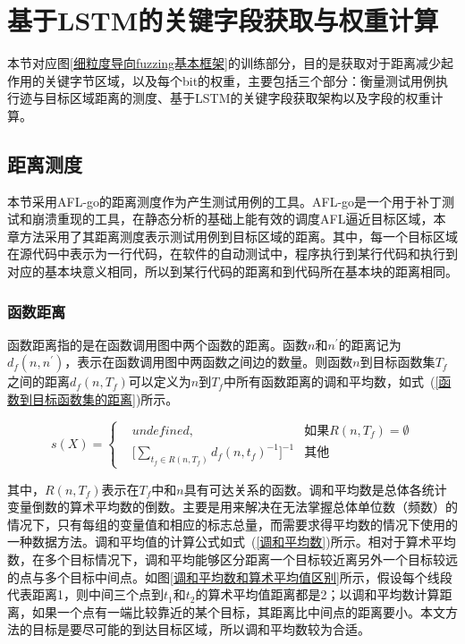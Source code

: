 \section{基于LSTM的关键字段获取与权重计算}
\label{基于LSTM的关键字段获取}

本节对应图\ref{细粒度导向fuzzing基本框架}的训练部分，目的是获取对于距离减少起作用的关键字节区域，以及每个bit的权重，主要包括三个部分：衡量测试用例执行迹与目标区域距离的测度、基于LSTM的关键字段获取架构以及字段的权重计算。

\subsection{距离测度}
\label{距离测度}

本节采用AFL-go的距离测度作为产生测试用例的工具。AFL-go是一个用于补丁测试和崩溃重现的工具，在静态分析的基础上能有效的调度AFL逼近目标区域，本章方法采用了其距离测度表示测试用例到目标区域的距离。其中，每一个目标区域在源代码中表示为一行代码，在软件的自动测试中，程序执行到某行代码和执行到对应的基本块意义相同，所以到某行代码的距离和到代码所在基本块的距离相同。

\subsubsection{函数距离}

函数距离指的是在函数调用图中两个函数的距离。函数$n$和$n^{'}$的距离记为$d_{f}(n,n^{'})$，表示在函数调用图中两函数之间边的数量。则函数$n$到目标函数集$T_f$之间的距离$d_f (n,T_f)$可以定义为$n$到$T_f$中所有函数距离的调和平均数，如式~(\ref{函数到目标函数集的距离})所示。

\begin{equation}\label{函数到目标函数集的距离}
s(X)=\left\{
\begin{aligned}
& undefined, & \text{如果} R(n, T_{f}) = \emptyset \\
& \lbrack \sum_{t_f \in R(n, T_{f})}d_{f}(n,t_{f})^{-1}\rbrack ^{-1} & \text{其他}
\end{aligned}
\right.
\end{equation} 

其中，$R(n,T_{f})$表示在$T_f$中和$n$具有可达关系的函数。调和平均数是总体各统计变量倒数的算术平均数的倒数。主要是用来解决在无法掌握总体单位数（频数）的情况下，只有每组的变量值和相应的标志总量，而需要求得平均数的情况下使用的一种数据方法。调和平均值的计算公式如式~(\ref{调和平均数})所示。相对于算术平均数，在多个目标情况下，调和平均能够区分距离一个目标较近离另外一个目标较远的点与多个目标中间点。如图\ref{调和平均数和算术平均值区别}所示，假设每个线段代表距离1，则中间三个点到$t_1$和$t_2$的算术平均值距离都是2；以调和平均数计算距离，如果一个点有一端比较靠近的某个目标，其距离比中间点的距离要小。本文方法的目标是要尽可能的到达目标区域，所以调和平均数较为合适。

